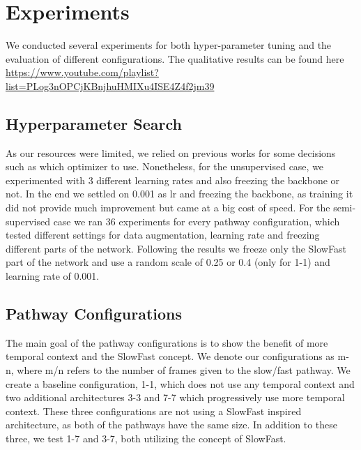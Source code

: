 \section{Experiments}
We conducted several experiments for both hyper-parameter tuning and the evaluation of different configurations.
The qualitative results can be found here \url{https://www.youtube.com/playlist?list=PLog3nOPCjKBnjhuHMIXu4ISE4Z4f2jm39}

\subsection{Hyperparameter Search}
As our resources were limited, we relied on previous works for some decisions such as which optimizer to use. Nonetheless, for the unsupervised case, we experimented with 3 different learning rates and also freezing the backbone or not. In the end we settled on 0.001 as lr and freezing the backbone, as training it did not provide much improvement but came at a big cost of speed. For the semi-supervised case we ran 36 experiments for every pathway configuration, which tested different settings for data augmentation, learning rate and freezing different parts of the network. Following the results we freeze only the SlowFast part of the network and use a random scale of 0.25 or 0.4 (only for 1-1) and learning rate of 0.001.

\subsection{Pathway Configurations}
The main goal of the pathway configurations is to show the benefit of more temporal context and the SlowFast concept. We denote our configurations as m-n, where m/n refers to the number of frames given to the slow/fast pathway.
We create a baseline configuration, 1-1, which does not use any temporal context and two additional architectures 3-3 and 7-7 which progressively use more temporal context. These three configurations are not using a SlowFast inspired architecture, as both of the pathways have the same size. In addition to these three, we test 1-7 and 3-7, both utilizing the concept of SlowFast.

